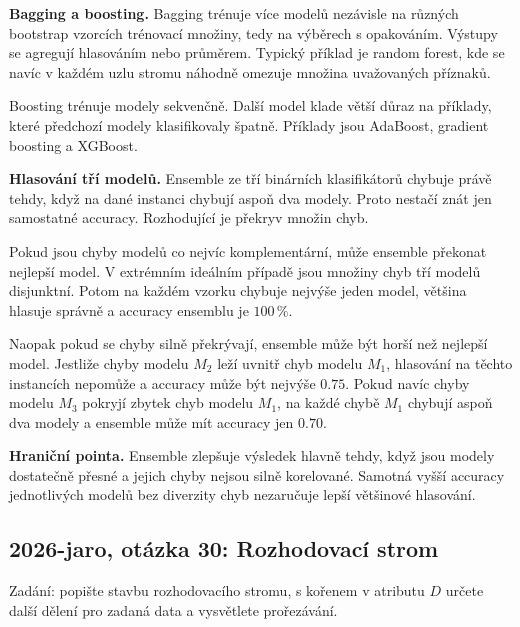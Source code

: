 \begin{odpoved}
\textbf{Bagging a boosting.} Bagging trénuje více modelů nezávisle na různých bootstrap
vzorcích trénovací množiny, tedy na výběrech s opakováním. Výstupy se agregují
hlasováním nebo průměrem. Typický příklad je random forest, kde se navíc v každém uzlu
stromu náhodně omezuje množina uvažovaných příznaků.

Boosting trénuje modely sekvenčně. Další model klade větší důraz na příklady, které
předchozí modely klasifikovaly špatně. Příklady jsou AdaBoost, gradient boosting a
XGBoost.

\textbf{Hlasování tří modelů.} Ensemble ze tří binárních klasifikátorů chybuje právě tehdy,
když na dané instanci chybují aspoň dva modely. Proto nestačí znát jen samostatné accuracy.
Rozhodující je překryv množin chyb.

Pokud jsou chyby modelů co nejvíc komplementární, může ensemble překonat nejlepší model.
V extrémním ideálním případě jsou množiny chyb tří modelů disjunktní. Potom na každém
vzorku chybuje nejvýše jeden model, většina hlasuje správně a accuracy ensemblu je
$100\,\%$.

Naopak pokud se chyby silně překrývají, ensemble může být horší než nejlepší model. Jestliže
chyby modelu $M_2$ leží uvnitř chyb modelu $M_1$, hlasování na těchto instancích nepomůže
a accuracy může být nejvýše $0.75$. Pokud navíc chyby modelu $M_3$ pokryjí zbytek chyb
modelu $M_1$, na každé chybě $M_1$ chybují aspoň dva modely a ensemble může mít accuracy
jen $0.70$.

\textbf{Hraniční pointa.} Ensemble zlepšuje výsledek hlavně tehdy, když jsou modely dostatečně
přesné a jejich chyby nejsou silně korelované. Samotná vyšší accuracy jednotlivých modelů
bez diverzity chyb nezaručuje lepší většinové hlasování.
\end{odpoved}

\subsection{2026-jaro, otázka 30: Rozhodovací strom}

Zadání: popište stavbu rozhodovacího stromu, s kořenem v atributu $D$ určete další dělení
pro zadaná data a vysvětlete prořezávání.

